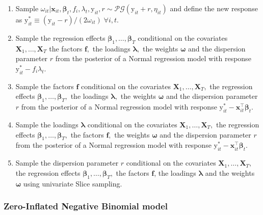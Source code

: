 \documentclass[a4paper, preprint, 3p,
authoryear]{elsarticle} %
\begin{document}
\begin{enumerate}
    \item Sample $\omega_{it}|\textbf{x}_{it},\boldsymbol{\beta}_t,f_i,\lambda_t,\text{y}_{it}, r \sim \mathcal{PG}(\text{y}_{it}+r, \eta_{it})$ and define the new response as $\text{y}_{it}^* \equiv (\text{y}_{it}-r)/(2\omega_{it})\; \forall i,t$.
    \item Sample the regression effects $\boldsymbol{\beta}_1,\dots,\boldsymbol{\beta}_T$ conditional on the covariates $\textbf{X}_1,\dots,\textbf{X}_T$ the factors $\mathbf{f},$ the loadings $\boldsymbol{\lambda},$ the weights $\boldsymbol{\omega}$ and the dispersion parameter $r$ from the posterior of a Normal regression model with response $\text{y}_{it}^*-f_i\lambda_t.$
    \item Sample the factors $\mathbf{f}$ conditional on the covariates $\textbf{X}_1,\dots,\textbf{X}_T,$ the regression effects $\boldsymbol{\beta}_1,\dots,\boldsymbol{\beta}_T,$ the loadings $\boldsymbol{\lambda},$ the weights $\boldsymbol{\omega}$ and the dispersion parameter $r$ from the posterior of a Normal regression model with response  $\text{y}_{it}^*-\textbf{x}_{it}^\top \boldsymbol{\beta}_t$.
    \item Sample the loadings $\boldsymbol{\lambda}$ conditional on the covariates $\textbf{X}_1,\dots,\textbf{X}_T,$ the regression effects $\boldsymbol{\beta}_1,\dots,\boldsymbol{\beta}_T,$ the factors $\mathbf{f},$ the weights $\boldsymbol{\omega}$ and the dispersion parameter $r$ from the posterior of a Normal regression model with response  $\text{y}_{it}^*-\textbf{x}_{it}^\top \boldsymbol{\beta}_t.$
    \item Sample the dispersion parameter $r$ conditional on the covariates $\textbf{X}_1,\dots,\textbf{X}_T,$ the regression effects $\boldsymbol{\beta}_1,\dots,\boldsymbol{\beta}_T,$ the factors $\mathbf{f}$, the loadings $\boldsymbol{\lambda}$ and the weights $\boldsymbol{\omega}$ using univariate Slice sampling. 
\end{enumerate}

\subsubsection{Zero-Inflated Negative Binomial
model}\label{zero-inflated-negative-binomial-model-1}
\end{document}

